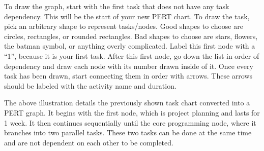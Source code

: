 \documentclass[12pt]{article}
\begin{document}
To draw the graph, start with the first task that does not have any task dependency.
This will be the start of your new PERT chart.
To draw the task, pick an arbitrary shape to represent tasks/nodes.  Good shapes to choose are circles, rectangles, or rounded rectangles.  Bad shapes to choose are stars, flowers, the batman symbol, or anything overly complicated.
Label this first node with a ``1'', because it is your first task.  After this first node, go down the list
in order of dependency and draw each node with its number drawn inside of it.  Once every task has been drawn,
start connecting them in order with arrows.  These arrows should be labeled with the activity name and duration.
\newline\newline
{}
\newline

The above illustration details the previously shown task chart converted into a PERT graph.  It begins with the first node, which is project planning and lasts for 1 week.  It then continues sequentially until the core programming node, where it branches into two parallel tasks.  These two tasks can be done at the same time and are not dependent on each other to be completed.
\end{document}
